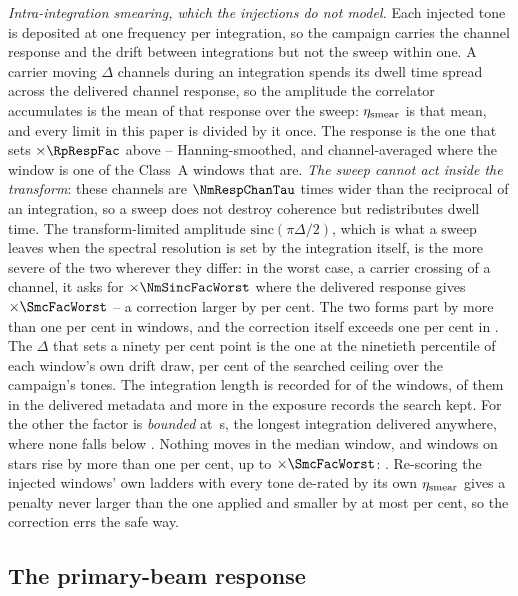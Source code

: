 \emph{Intra-integration smearing, which the injections do not model.} Each
injected tone is deposited at one frequency per integration, so the campaign
carries the channel response and the drift between integrations but not the
sweep within one. A carrier moving $\Delta$ channels during an integration
spends its dwell time spread across the delivered channel response, so the
amplitude the correlator accumulates is the mean of that response over the
sweep: $\eta_{\rm smear}$ is that mean, and every limit in this paper is
divided by it once. The response is the one that sets $\times\RpRespFac$ above --
Hanning-smoothed, and channel-averaged where the window is one of the
\NmRespNAvgA{} Class~A windows that are. \emph{The sweep cannot act inside
the transform}: these channels are $\NmRespChanTau$ times wider than the
reciprocal of an integration, so a sweep does not destroy coherence but
redistributes dwell time. The transform-limited amplitude
$\mathrm{sinc}(\pi\Delta/2)$, which is what a sweep leaves when the spectral
resolution is set by the integration itself, is the more severe of the two
wherever they differ: in the worst case, a carrier crossing
\NmRespDeltaWorst{} of a channel, it asks for $\times\NmSincFacWorst$ where
the delivered response gives $\times\SmcFacWorst$ -- a correction larger by
\NmRespOverPct{} per cent. The two forms part by more than one per cent in \NmRespNPart{} windows,
and the correction itself exceeds one per cent in \NmRespNApplied.
The $\Delta$ that sets a ninety
per cent point is the one at the ninetieth percentile of each window's own
drift draw, \SmcQninePct{} per cent of the searched ceiling over the
campaign's \SmcNTone{} tones. The integration length is recorded for
\SmcNMeas{} of the \NWindows{} windows, \CsNDumpWin{} of them in the delivered
metadata and \SmNRecov{} more in the exposure records the search kept. For the
other \SmcNBound{} the factor is \emph{bounded} at \SmcDtCeil\,s, the longest
integration delivered anywhere, where none falls below \SmcBoundEta.
Nothing moves in the median window, and \SmcNAbove{} windows on
\SmcNAboveStar{} stars rise by more than one per cent, up to
$\times\SmcFacWorst$: \SmcAboveStars. Re-scoring the \SmcValNWin{} injected
windows' own ladders with every tone de-rated by its own $\eta_{\rm smear}$
gives a penalty never larger than the one applied and smaller by at most
\SmcValWorstPct{} per cent, so the correction errs the safe way.

\subsection{The primary-beam response}
\label{app:pbresp}

